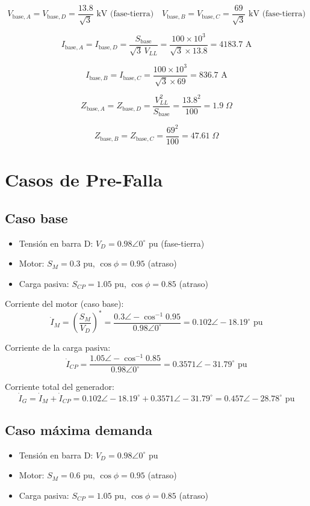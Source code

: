 \documentclass[12pt,a4paper]{article}
\begin{document}
\[
V_{\text{base},A} = V_{\text{base},D} = \frac{13.8}{\sqrt{3}}\text{ kV (fase-tierra)} \quad
V_{\text{base},B} = V_{\text{base},C} = \frac{69}{\sqrt{3}}\text{ kV (fase-tierra)}
\]

\[
I_{\text{base},A} = I_{\text{base},D} = \frac{S_{\text{base}}}{\sqrt{3}\,V_{LL}} = \frac{100\times10^3}{\sqrt{3}\times13.8} = 4183.7\text{ A}
\]

\[
I_{\text{base},B} = I_{\text{base},C} = \frac{100\times10^3}{\sqrt{3}\times69} = 836.7\text{ A}
\]

\[
Z_{\text{base},A} = Z_{\text{base},D} = \frac{V_{LL}^2}{S_{\text{base}}} = \frac{13.8^2}{100} = 1.9\;\Omega
\]

\[
Z_{\text{base},B} = Z_{\text{base},C} = \frac{69^2}{100} = 47.61\;\Omega
\]

\section{Casos de Pre-Falla}

\subsection{Caso base}
\begin{itemize}
    \item Tensión en barra D: $V_D = 0.98\angle0^\circ$ pu (fase-tierra)
    \item Motor: $S_M = 0.3$ pu, $\cos\phi = 0.95$ (atraso)
    \item Carga pasiva: $S_{CP} = 1.05$ pu, $\cos\phi = 0.85$ (atraso)
\end{itemize}

Corriente del motor (caso base):
\[
\dot{I}_M = \left(\frac{S_M}{V_D}\right)^* = \frac{0.3\angle-\cos^{-1}0.95}{0.98\angle0^\circ} = 0.102\angle-18.19^\circ\text{ pu}
\]

Corriente de la carga pasiva:
\[
\dot{I}_{CP} = \frac{1.05\angle-\cos^{-1}0.85}{0.98\angle0^\circ} = 0.3571\angle-31.79^\circ\text{ pu}
\]

Corriente total del generador:
\[
\dot{I}_G = \dot{I}_M + \dot{I}_{CP} = 0.102\angle-18.19^\circ + 0.3571\angle-31.79^\circ = 0.457\angle-28.78^\circ\text{ pu}
\]

\subsection{Caso máxima demanda}
\begin{itemize}
    \item Tensión en barra D: $V_D = 0.98\angle0^\circ$ pu
    \item Motor: $S_M = 0.6$ pu, $\cos\phi = 0.95$ (atraso)
    \item Carga pasiva: $S_{CP} = 1.05$ pu, $\cos\phi = 0.85$ (atraso)
\end{itemize}
\end{document}
